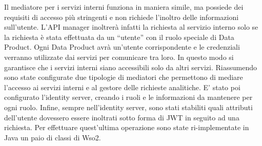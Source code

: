\documentclass[12pt]{report}
\begin{document}
Il mediatore per i servizi interni funziona in maniera simile, ma possiede dei requisiti di accesso più stringenti e non richiede l'inoltro delle informazioni sull'utente.
L'API manager inoltrerà infatti la richiesta al servizio interno solo se la richiesta è stata effettuata da un ``utente'' con il ruolo speciale di Data Product.
Ogni Data Product avrà un'utente corrispondente e le credenziali verranno utilizzate dai servizi per comunicare tra loro.
In questo modo si garantisce che i servizi interni siano accessibili solo da altri servizi.
Riassumendo sono state configurate due tipologie di mediatori che permettono di mediare l'accesso ai servizi interni e al gestore delle richieste analitiche.
E' stato poi configurato l'identity server, creando i ruoli e le informazioni da mantenere per ogni ruolo.
Infine, sempre nell'identity server, sono stati stabiliti quali attributi dell'utente dovessero essere inoltrati sotto forma di JWT in seguito ad una richiesta.
Per effettuare quest'ultima operazione sono state ri-implementate in Java un paio di classi di Wso2.
\end{document}

